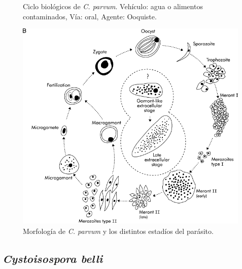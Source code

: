 \begin{multicols}{2}
\begin{figure}[H]
		\caption[Ciclo biológico de \textit{C. parvum}]{Ciclo biológicos de \textit{C. parvum}. Vehículo: agua o alimentos contaminados, Vía: oral, Agente: Ooquiste.\label{fig:PARASIT:CparvumCBios}}
	\end{figure}
	\columnbreak
	\vspace*{2.47cm}
	\begin{figure}[H]
		\centering
		\includegraphics[width=\columnwidth]{A.imagenes/ACV-BioSan-Parasit-CparvumMorf}
		\caption[Morfología de \textit{C. parvum}]{Morfología de \textit{C. parvum} y los distintos estadíos del parásito.\label{fig:PARASIT:CparvumMorf}}
	\end{figure}
\end{multicols}
\newpage
\subsection{\textit{Cystoisospora belli}}
